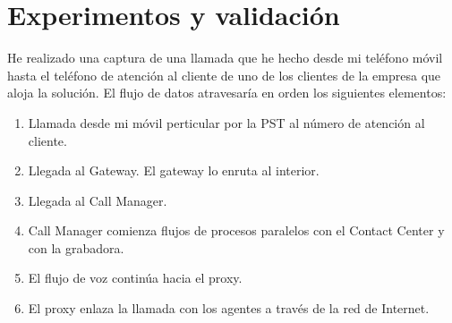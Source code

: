 \documentclass[a4paper, 12pt]{book}
\begin{document}
\cleardoublepage
\chapter{Experimentos y validación}

He realizado una captura de una llamada que he hecho desde mi teléfono móvil hasta el teléfono de atención al cliente de uno de los clientes de la empresa que aloja la solución. El flujo de datos atravesaría en orden los siguientes elementos:
\begin{enumerate}
  \item Llamada desde mi móvil perticular por la PST al número de atención al cliente.
  \item Llegada al Gateway. El gateway lo enruta al interior.
  \item Llegada al Call Manager.
  \item Call Manager comienza flujos de procesos paralelos con el Contact Center y con la grabadora.
  \item El flujo de voz continúa hacia el proxy.
  \item El proxy enlaza la llamada con los agentes a través de la red de Internet.
\end{enumerate}
\end{document}
